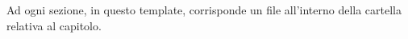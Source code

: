 Ad ogni sezione, in questo template, corrisponde un file all'interno della 
cartella relativa al capitolo.